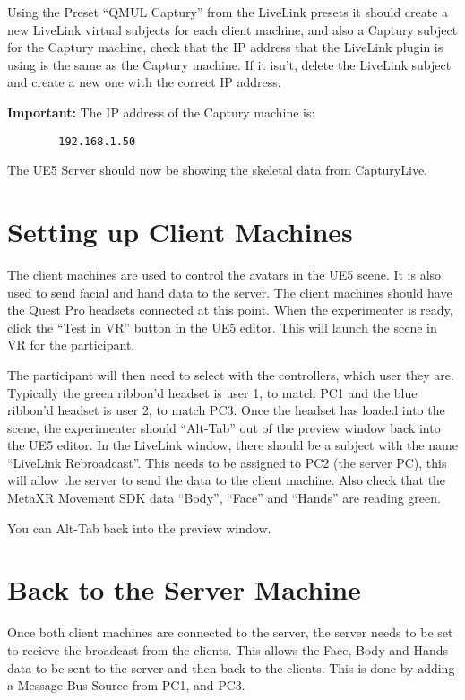 Using the Preset ``QMUL Captury'' from the LiveLink presets it should create a new LiveLink virtual subjects for each client machine, and also a Captury subject for the Captury machine, check that the IP address that the LiveLink plugin is using is the same as the Captury machine. If it isn't, delete the LiveLink subject and create a new one with the correct IP address.

\begin{tcolorbox}
    \textbf{Important: } The IP address of the Captury machine is: 
    \begin{verbatim}
        192.168.1.50
    \end{verbatim}
\end{tcolorbox}

The UE5 Server should now be showing the skeletal data from CapturyLive.

\section{Setting up Client Machines}
The client machines are used to control the avatars in the UE5 scene. It is also used to send facial and hand data to the server. The client machines should have the Quest Pro headsets connected at this point. When the experimenter is ready, click the ``Test in VR'' button in the UE5 editor. This will launch the scene in VR for the participant.

The participant will then need to select with the controllers, which user they are. Typically the green ribbon'd headset is user 1, to match PC1 and the blue ribbon'd headset is user 2, to match PC3. Once the headset has loaded into the scene, the experimenter should ``Alt-Tab'' out of the preview window back into the UE5 editor. In the LiveLink window, there should be a subject with the name ``LiveLink Rebroadcast''. This needs to be assigned to PC2 (the server PC), this will allow the server to send the data to the client machine. Also check that the MetaXR Movement SDK data ``Body'', ``Face'' and ``Hands'' are reading green.

You can Alt-Tab back into the preview window.

\section{Back to the Server Machine}
Once both client machines are connected to the server, the server needs to be set to recieve the broadcast from the clients. This allows the Face, Body and Hands data to be sent to the server and then back to the clients. This is done by adding a Message Bus Source from PC1, and PC3.

